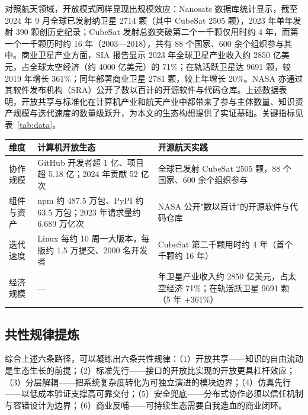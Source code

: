 \documentclass[UTF8,a4paper,zihao=-4]{ctexart}
\begin{document}
对照航天领域，开放模式同样显现出规模效应：Nanosats 数据库统计显示，截至 2024 年 9 月全球已发射纳卫星 2714 颗（其中 CubeSat 2505 颗），2023 年单年发射 390 颗创历史纪录；CubeSat 发射总数突破第二个一千颗仅用时约 4 年，而第一个一千颗历时约 16 年（2003—2018），共有 88 个国家、600 余个组织参与其中\cite{kulu2024}。商业卫星产业方面，SIA 报告显示 2023 年全球卫星产业收入约 2850 亿美元，占全球太空经济（约 4000 亿美元）的 71\%；在轨活跃卫星达 9691 颗，较 2019 年增长 361\%；同年部署商业卫星 2781 颗，较上年增长 20\%\cite{sia2024}。NASA 亦通过其软件发布机构（SRA）公开了数以百计的开源软件与代码仓库\cite{nasa}。上述数据表明，开放共享与标准化在计算机产业和航天产业中都带来了参与主体数量、知识资产规模与迭代速度的数量级跃升，为本文的生态构想提供了实证基础。关键指标见表~\ref{tab:data}。

\begin{landscape}
\vfill
\centering
{}
\label{tab:data}
\begin{tabularx}{\textheight}{@{}>{\raggedright\arraybackslash}p{2.2cm}>{\raggedright\arraybackslash}X>{\raggedright\arraybackslash}X@{}}
\toprule
维度 & 计算机开放生态 & 开源航天实践 \\
\midrule
协作规模 & GitHub 开发者超 1 亿、项目超 5.18 亿；2024 年贡献 52 亿次\cite{octoverse2024} & 全球已发射 CubeSat 2505 颗，88 个国家、600 余个组织参与\cite{kulu2024} \\
组件与资产 & npm 约 487.5 万包、PyPI 约 63.5 万包；2023 年请求量约 6.689 万亿次\cite{sonatype2024} & NASA 公开"数以百计"的开源软件与代码仓库\cite{nasa} \\
迭代速度 & Linux 每约 10 周一大版本，每版约 1.5 万提交、2000 名开发者\cite{lwn2023} & CubeSat 第二千颗用时约 4 年（首个千颗约 16 年）\cite{kulu2024} \\
经济规模 & — & 2023 年卫星产业收入约 2850 亿美元，占太空经济 71\%；在轨活跃卫星 9691 颗（5 年 +361\%）\cite{sia2024} \\
\bottomrule
\end{tabularx}
\vfill
\end{landscape}

\subsection{共性规律提炼}
综合上述六条路径，可以凝练出六条共性规律：（1）开放共享——知识的自由流动是生态生长的前提；（2）标准先行——接口的开放比实现的开放更具杠杆效应；（3）分层解耦——把系统复杂度转化为可独立演进的模块边界；（4）仿真先行——以低成本验证支撑高可靠交付；（5）安全兜底——分布式协作必须以信任机制与容错设计为边界；（6）商业反哺——可持续生态需要自我造血的商业闭环。
\end{document}
